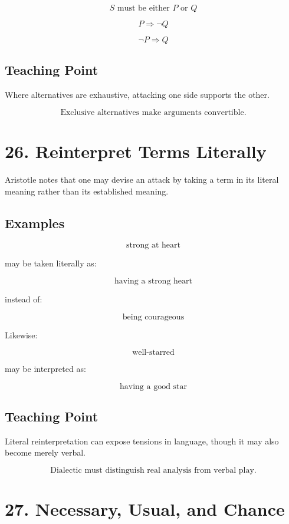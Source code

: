 \documentclass[12pt]{article}
\begin{document}
\[
S \text{ must be either } P \text{ or } Q
\]

\[
P \Rightarrow \neg Q
\]

\[
\neg P \Rightarrow Q
\]

\subsection*{Teaching Point}

Where alternatives are exhaustive, attacking one side supports the other.

\[
\boxed{
\text{Exclusive alternatives make arguments convertible.}
}
\]

\section*{26. Reinterpret Terms Literally}

Aristotle notes that one may devise an attack by taking a term in its literal
meaning rather than its established meaning.

\subsection*{Examples}

\[
\text{strong at heart}
\]

may be taken literally as:

\[
\text{having a strong heart}
\]

instead of:

\[
\text{being courageous}
\]

Likewise:

\[
\text{well-starred}
\]

may be interpreted as:

\[
\text{having a good star}
\]

\subsection*{Teaching Point}

Literal reinterpretation can expose tensions in language, though it may also
become merely verbal.

\[
\boxed{
\text{Dialectic must distinguish real analysis from verbal play.}
}
\]

\section*{27. Necessary, Usual, and Chance}
\end{document}
